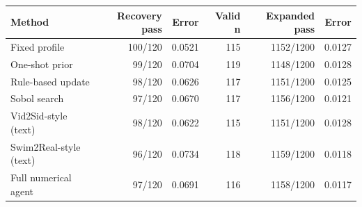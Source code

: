 \begin{tabular}{lrrrrr}
\toprule
Method & Recovery pass & Error & Valid n & Expanded pass & Error \\
\midrule
Fixed profile & 100/120 & 0.0521 & 115 & 1152/1200 & 0.0127 \\
One-shot prior & 99/120 & 0.0704 & 119 & 1148/1200 & 0.0128 \\
Rule-based update & 98/120 & 0.0626 & 117 & 1151/1200 & 0.0125 \\
Sobol search & 97/120 & 0.0670 & 117 & 1156/1200 & 0.0121 \\
Vid2Sid-style (text) & 98/120 & 0.0622 & 115 & 1151/1200 & 0.0128 \\
Swim2Real-style (text) & 96/120 & 0.0734 & 118 & 1159/1200 & 0.0118 \\
Full numerical agent & 97/120 & 0.0691 & 116 & 1158/1200 & 0.0117 \\
\bottomrule
\end{tabular}

